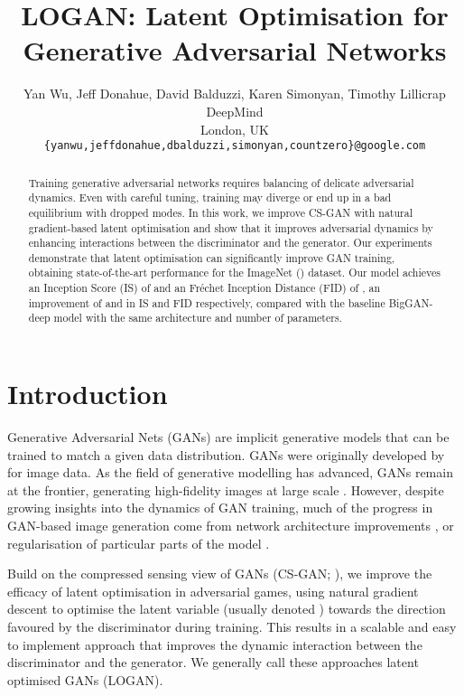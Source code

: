 \documentclass{article} \usepackage{iclr2020_conference,times}
\title{LOGAN: Latent Optimisation for Generative Adversarial Networks}
\author{Yan Wu, Jeff Donahue, David Balduzzi, Karen Simonyan, Timothy Lillicrap\\
DeepMind\\
London, UK \\
\texttt{\{yanwu,jeffdonahue,dbalduzzi,simonyan,countzero\}@google.com} \\
}
\begin{document}
\maketitle

\begin{abstract}
Training generative adversarial networks requires balancing of delicate adversarial dynamics. 
Even with careful tuning, training may diverge or end up in a bad equilibrium with dropped modes. 
In this work, we improve CS-GAN with natural gradient-based latent optimisation and show that it improves adversarial dynamics by enhancing interactions between the discriminator and the generator. 
Our experiments demonstrate that latent optimisation can significantly improve GAN training, obtaining state-of-the-art performance for the ImageNet () dataset. Our model achieves an Inception Score (IS) of  and an Fr\'{e}chet Inception Distance (FID) of , an improvement of  and  in IS and FID respectively, compared with the baseline BigGAN-deep model with the same architecture and number of parameters.
\end{abstract}




\section{Introduction}

Generative Adversarial Nets (GANs) are implicit generative models that can be trained to match a given data distribution.  GANs were originally developed by~\citet{goodfellow2014generative} for image data.
As the field of generative modelling has advanced, GANs remain at the frontier, generating high-fidelity images at large scale \citep{brock2018large,karras2019style}. 
However, despite growing insights into the dynamics of GAN training, much of the progress in GAN-based image generation come from network architecture improvements \citep{radford2015unsupervised,zhang2019self}, or regularisation of particular parts of the model \citep{miyato2018spectral,miyato2018cgans}.

Build on the compressed sensing view of GANs (CS-GAN; \citealp{wu2019deep}), we improve the efficacy of latent optimisation in adversarial games, using natural gradient descent to optimise the latent variable (usually denoted ) towards the direction favoured by the discriminator during training.
This results in a scalable and easy to implement approach that improves the dynamic interaction between the discriminator and the generator.
We generally call these approaches latent optimised GANs (LOGAN).
\end{document}
